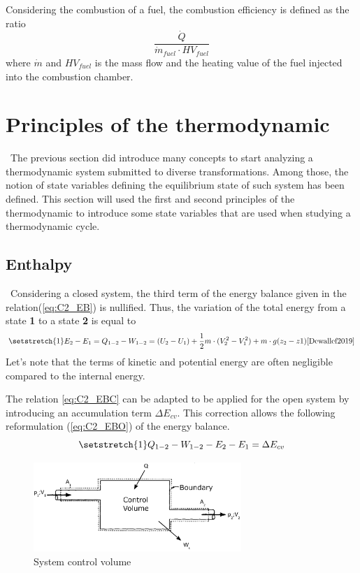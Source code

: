 Considering the combustion of a fuel, the combustion efficiency is defined as the ratio
$$ \frac{\dot{Q}}{\dot{m}_{fuel}\cdot HV_{fuel}}$$
where $\dot{m}$  and $HV_{fuel}$ is the mass flow and the heating value of the fuel injected into the combustion chamber.
\section{Principles of the thermodynamic}
\quad\, The previous section did introduce many concepts to start analyzing a thermodynamic system submitted to diverse transformations. Among those, the notion of state variables defining the equilibrium state of such system has been defined. This section will used the first and second principles of the thermodynamic to introduce some state variables that are used when studying a thermodynamic cycle.

\subsection{Enthalpy}
\quad\, Considering a closed system, the third term of the energy balance given in the relation(\ref{eq:C2_EB}) is nullified. Thus, the variation of the total energy from a state \textbf{1} to a state \textbf{2} is equal to
\begin{equation}
\setstretch{1}
E_{2} - E_{1} = Q_{1-2} - W_{1-2} = (U_2 - U_1) + \frac{1}{2}m\cdot(V^2_2 - V^2_1) + m\cdot g(z_2 - z1)\citep{Dewallef2019} \label{eq:C2_EBC}
\end{equation}
Let's note that the terms of kinetic and potential energy are often negligible compared to the internal energy.  

The relation \ref{eq:C2_EBC} can be adapted to be applied for the open system by introducing an accumulation term $\Delta E_{cv}$. This correction allows the following reformulation (\ref{eq:C2_EBO}) of the energy balance.
\begin{equation}
\setstretch{1}
Q_{1-2} - W_{1-2} - E_{2} - E_{1} = \Delta E_{cv}\label{eq:C2_EBO}
\end{equation}

\begin{figure}[h]
\centering
\includegraphics[width=0.7\textwidth]{control_volume.png}
\caption{System control volume \cite{Dewallef2019}}
\label{fig:C2_VC}
\end{figure}

